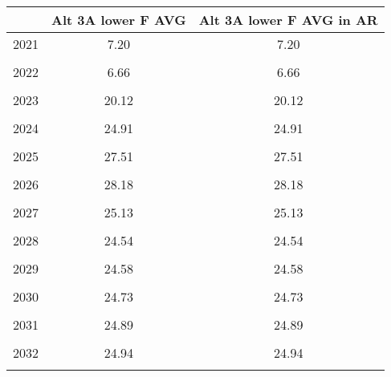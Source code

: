 \begin{tabular}{l*{2}{c}}
\hline\hline
                &Alt 3A lower F AVG&Alt 3A lower F AVG in AR\\
\hline
2021            &     7.20&     7.20\\
                &         &         \\
2022            &     6.66&     6.66\\
                &         &         \\
2023            &    20.12&    20.12\\
                &         &         \\
2024            &    24.91&    24.91\\
                &         &         \\
2025            &    27.51&    27.51\\
                &         &         \\
2026            &    28.18&    28.18\\
                &         &         \\
2027            &    25.13&    25.13\\
                &         &         \\
2028            &    24.54&    24.54\\
                &         &         \\
2029            &    24.58&    24.58\\
                &         &         \\
2030            &    24.73&    24.73\\
                &         &         \\
2031            &    24.89&    24.89\\
                &         &         \\
2032            &    24.94&    24.94\\
                &         &         \\
\hline\hline
\end{tabular}
